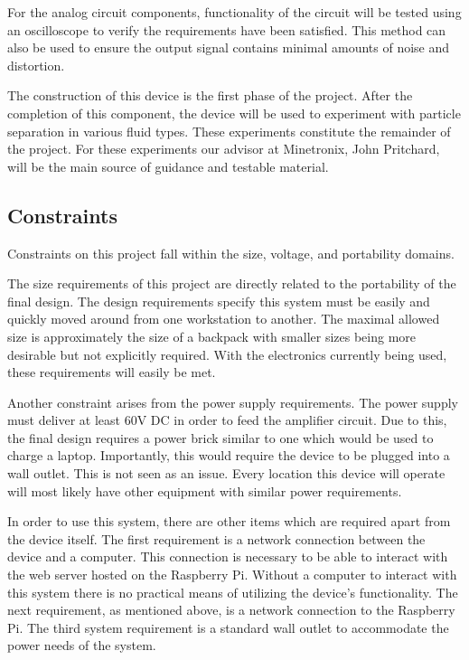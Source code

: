 \documentclass{article}	%
\begin{document}
\begin{multicols}{2}
For the analog circuit components,
functionality of the circuit will be tested
using an oscilloscope to verify 
the requirements have been satisfied.
This method can also be used to ensure 
the output signal contains minimal amounts of noise and distortion. 

The construction of this device is the first phase of the project.
After the completion of this component,
the device will be used 
to experiment with particle separation in various fluid types.
These experiments constitute the remainder of the project.
For these experiments our advisor at Minetronix, John Pritchard, 
will be the main source of guidance and testable material. 

\subsection{Constraints}
Constraints on this project fall within the size, voltage, and portability domains.

The size requirements of this project are directly related 
to the portability of the final design.
The design requirements specify this system must be easily and quickly
moved around from one workstation to another.
The maximal allowed size is approximately 
the size of a backpack 
with smaller sizes being more desirable
but not explicitly required.
With the electronics currently being used,
these requirements will easily be met.

Another constraint arises from the power supply requirements.
The power supply must deliver at least 60V DC in order to feed the amplifier circuit. 
Due to this, the final design requires a power brick
similar to one which would be used to charge a laptop.
Importantly, this would require the device to be plugged into a wall outlet.
This is not seen as an issue.
Every location this device will operate 
will most likely have other equipment with similar power requirements.

In order to use this system,
there are other items which are required
apart from the device itself. 
The first requirement is a network connection between the device and a computer.
This connection is necessary to be able to interact with the web server hosted on the Raspberry Pi. 
Without a computer to interact with this system there is no practical means of utilizing the device's functionality. 
The next requirement, as mentioned above, is a network connection to the Raspberry Pi. 
The third system requirement is a standard wall outlet
to accommodate the power needs of the system. 


\end{multicols}
\end{document}
